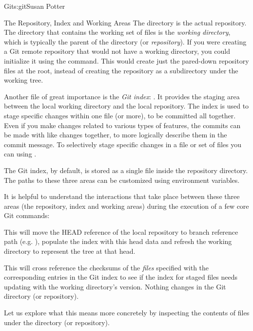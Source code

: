\begin{aosachapter}{Git}{s:git}{Susan Potter}
\begin{aosasect1}{The Repository, Index and Working Areas}
The  directory is the actual repository. The directory that contains the
working set of files is the \emph{working directory}, which is typically the
parent of the  directory (or \emph{repository}). If you were creating a
Git remote repository that would not have a working directory, you could
initialize it using the  command. This would create
just the pared-down repository files at the root, instead of creating the repository
as a subdirectory under the working tree.

Another file of great importance is the \emph{Git index}: . It provides the
staging area between the local working directory and the local repository.
The index is used to stage specific changes within one file (or more), to
be committed all together. Even if you make changes related to various types
of features, the commits can be made with like changes together, to more
logically describe them in the commit message. To selectively stage
specific changes in a file or set of files you can using .

The Git index, by default, is stored as a single file inside the
repository directory. The paths to these three areas can be customized
using environment variables.

It is helpful to understand the interactions that take place between these
three areas (the repository, index and working areas) during the execution
of a few core Git commands:

\begin{aosaitemize}
  \item {} 

  This will move the HEAD reference of the local repository to branch
  reference path (e.g. ), populate the index with
  this head data and refresh the working directory to represent the tree
  at that head.

  \item {}

  This will cross reference the checksums of the \emph{files}
  specified with the corresponding entries in the Git index to see if the
  index for staged files needs updating with the working directory's
  version. Nothing changes in the Git directory (or repository).
\end{aosaitemize}

Let us explore what this means more concretely by inspecting the contents of
files under the  directory (or repository).


\end{aosasect1}
\end{aosachapter}
